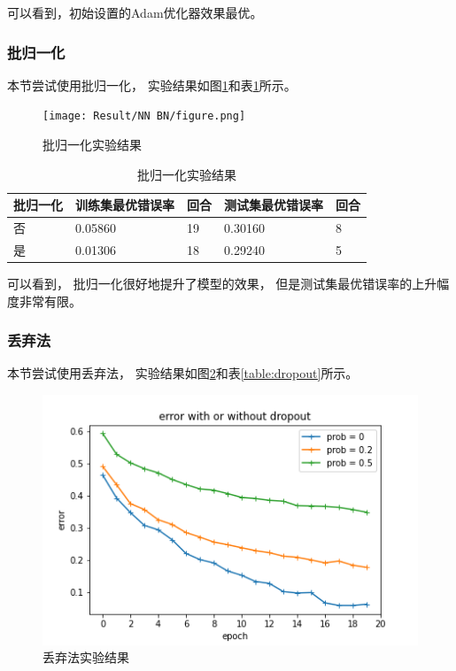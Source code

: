 \documentclass{article}
\begin{document}
可以看到，初始设置的Adam优化器效果最优。

\subsubsection{批归一化}

本节尝试使用批归一化，
实验结果如图\ref{fig:BN}和表\ref{table:BN}所示。

\begin{figure}[p]
\texttt{[image: Result/NN BN/figure.png]}
\caption{批归一化实验结果}
\label{fig:BN}
\end{figure}

\begin{table}[h]
\centering
\begin{tabular}{|l|l|l|l|l|} 
\hline
批归一化 & 训练集最优错误率 & 回合 & 测试集最优错误率 & 回合 \\
\hline
否 & 0.05860 & 19 & 0.30160 & 8 \\
是 & 0.01306 & 18 & 0.29240 & 5 \\
\hline
\end{tabular}
\caption{批归一化实验结果}
\label{table:BN}
\end{table}

可以看到，
批归一化很好地提升了模型的效果，
但是测试集最优错误率的上升幅度非常有限。

\subsubsection{丢弃法}

本节尝试使用丢弃法，
实验结果如图\ref{fig:dropout}和表\ref{table:dropout}所示。

\begin{figure}[p]
\includegraphics[width=\textwidth]
{Result/NN dropout 0.5/figure.png}
\caption{丢弃法实验结果}
\label{fig:dropout}
\end{figure}
\end{document}
